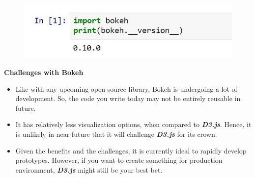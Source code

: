 \documentclass[a4paper,12pt]{article}
\begin{document}
\begin{figure}[h!]
	\centering
	\includegraphics[width=0.9\linewidth]{images/00-BOKEH-version-check}
\end{figure}
\newpage
\begin{framed}
	\noindent \textbf{Challenges with Bokeh}
	\begin{itemize}
		\item Like with any upcoming open source library, Bokeh is undergoing a lot of development. So, the code you write today may not be entirely reusable in future.
		
		\item  It has relatively less visualization options, when compared to \textbf{\textit{D3.js}}. Hence, it is unlikely in near future that it will challenge \textbf{\textit{D3.js}} for its crown.
		\item  Given the benefits and the challenges, it is currently ideal to rapidly develop prototypes. However, if you want to create something for production environment, \textbf{\textit{D3.js}} might still be your best bet.
	\end{itemize}
\end{framed}
\newpage


\end{document}
